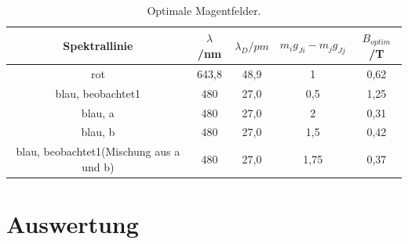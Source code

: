 \begin{table}
    \centering
    \caption{Optimale Magentfelder.}
    \label{tab:A}
    \begin{tabular}{c S[table-format=2.1] S[table-format=6.0] S S}
      \toprule
       {Spektrallinie} & {$\lambda$}/nm &{$\lambda_{\si{D}}/\si{pm}$}& {$m_i g_{Ji} - m_j g_{Jj}$} & {$B_{\si{optim}}$/T}\\
      \midrule
      \midrule
        rot                                        & 643,8  &  48,9 & 1   & 0,62\\
        blau, beobachtet1                          & 480    &  27,0 & 0,5 & 1,25\\
        blau, a                                    & 480    &  27,0 & 2   & 0,31\\
        blau, b                                    & 480    &  27,0 & 1,5 & 0,42\\
        blau, beobachtet1(Mischung aus a und b)    & 480    &  27,0 & 1,75& 0,37\\
      \bottomrule
    \end{tabular}
\end{table}
\FloatBarrier




\section{Auswertung}
\label{sec:Auswertung}






